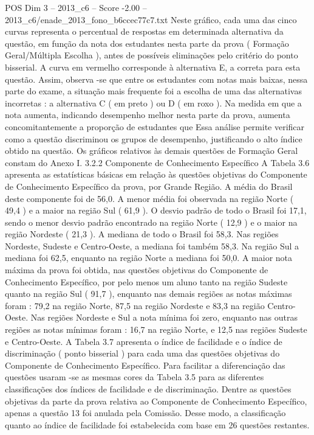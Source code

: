 \begin{textsample}{POS Dim 3 – 2013\_c6 – Score -2.00 – 2013\_c6/enade\_2013\_fono\_b6ccec77c7.txt}
Neste gráfico, cada uma das cinco curvas representa o percentual de respostas em determinada alternativa da questão, em função da nota dos estudantes nesta parte da prova ( Formação Geral/Múltipla Escolha ), antes de possíveis eliminações pelo critério do ponto bisserial.
A curva em vermelho corresponde à alternativa E, a correta para esta questão.
Assim, observa -se que entre os estudantes com notas mais baixas, nessa parte do exame, a situação mais frequente foi a escolha de uma das alternativas incorretas : a alternativa C ( em preto ) ou D ( em roxo ).
Na medida em que a nota aumenta, indicando desempenho melhor nesta parte da prova, aumenta concomitantemente a proporção de estudantes que Essa análise permite verificar como a questão discriminou os grupos de desempenho, justificando o alto índice obtido na questão.
Os gráficos relativos às demais questões de Formação Geral constam do Anexo I. 3.2.2 Componente de Conhecimento Específico A Tabela 3.6 apresenta as estatísticas básicas em relação às questões objetivas do Componente de Conhecimento Específico da prova, por Grande Região.
A média do Brasil deste componente foi de 56,0.
A menor média foi observada na região Norte ( 49,4 ) e a maior na região Sul ( 61,9 ).
O desvio padrão de todo o Brasil foi 17,1, sendo o menor desvio padrão encontrado na região Norte ( 12,9 ) e o maior na região Nordeste ( 21,3 ).
A mediana de todo o Brasil foi 58,3.
Nas regiões Nordeste, Sudeste e Centro-Oeste, a mediana foi também 58,3.
Na região Sul a mediana foi 62,5, enquanto na região Norte a mediana foi 50,0.
A maior nota máxima da prova foi obtida, nas questões objetivas do Componente de Conhecimento Específico, por pelo menos um aluno tanto na região Sudeste quanto na região Sul ( 91,7 ), enquanto nas demais regiões as notas máximas foram : 79,2 na região Norte, 87,5 na região Nordeste e 83,3 na região Centro-Oeste.
Nas regiões Nordeste e Sul a nota mínima foi zero, enquanto nas outras regiões as notas mínimas foram : 16,7 na região Norte, e 12,5 nas regiões Sudeste e Centro-Oeste.
A Tabela 3.7 apresenta o índice de facilidade e o índice de discriminação ( ponto bisserial ) para cada uma das questões objetivas do Componente de Conhecimento Específico.
Para facilitar a diferenciação das questões usaram -se as mesmas cores da Tabela 3.5 para as diferentes classificações dos índices de facilidade e de discriminação.
Dentre as questões objetivas da parte da prova relativa ao Componente de Conhecimento Específico, apenas a questão 13 foi anulada pela Comissão.
Desse modo, a classificação quanto ao índice de facilidade foi estabelecida com base em 26 questões restantes.

\end{textsample}
